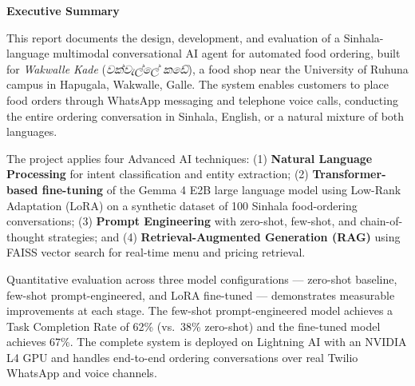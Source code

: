 \documentclass[12pt,a4paper]{report}
\newcommand{\si}[1]{{\sinhalafont #1}}
\begin{document}
\setcounter{page}{1}

\newpage
\thispagestyle{fancy}
\begin{center}
    \Large \textbf{Executive Summary}
\end{center}
\vspace{0.5cm}
\onehalfspacing

This report documents the design, development, and evaluation of a Sinhala-language multimodal conversational AI agent for automated food ordering, built for \textit{Wakwalle Kade} (\textit{\si{වක්වැල්ලේ කඩේ}}), a food shop near the University of Ruhuna campus in Hapugala, Wakwalle, Galle. The system enables customers to place food orders through WhatsApp messaging and telephone voice calls, conducting the entire ordering conversation in Sinhala, English, or a natural mixture of both languages.

The project applies four Advanced AI techniques: (1) \textbf{Natural Language Processing} for intent classification and entity extraction; (2) \textbf{Transformer-based fine-tuning} of the Gemma 4 E2B large language model using Low-Rank Adaptation (LoRA) on a synthetic dataset of 100 Sinhala food-ordering conversations; (3) \textbf{Prompt Engineering} with zero-shot, few-shot, and chain-of-thought strategies; and (4) \textbf{Retrieval-Augmented Generation (RAG)} using FAISS vector search for real-time menu and pricing retrieval.

Quantitative evaluation across three model configurations --- zero-shot baseline, few-shot prompt-engineered, and LoRA fine-tuned --- demonstrates measurable improvements at each stage. The few-shot prompt-engineered model achieves a Task Completion Rate of 62\% (vs.\ 38\% zero-shot) and the fine-tuned model achieves 67\%. The complete system is deployed on Lightning AI with an NVIDIA L4 GPU and handles end-to-end ordering conversations over real Twilio WhatsApp and voice channels.

\newpage
\tableofcontents
\listoftables
\newpage

\setcounter{page}{1}

\end{document}

